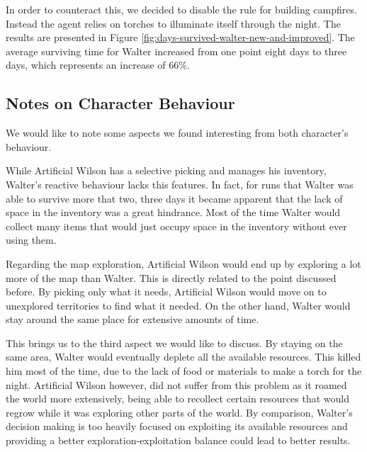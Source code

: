 In order to counteract this, we decided to disable the rule for building campfires.
Instead the agent relies on torches to illuminate itself through the night.
The results are presented in Figure \ref{fig:days-survived-walter-new-and-improved}.
The average surviving time for Walter increased from one point eight days to three days, which represents an increase of 66\%. 


\subsection{Notes on Character Behaviour}

\noindent We would like to note some aspects we found interesting from both character's behaviour.

While Artificial Wilson has a selective picking and manages his inventory, Walter's reactive behaviour lacks this features.
In fact, for runs that Walter was able to survive more that two, three days it became apparent that the lack of space in the inventory was a great hindrance.
Most of the time Walter would collect many items that would just occupy space in the inventory without ever using them.

Regarding the map exploration, Artificial Wilson would end up by exploring a lot more of the map than Walter.
This is directly related to the point discussed before.
By picking only what it needs, Artificial Wilson would move on to unexplored territories to find what it needed.
On the other hand, Walter would stay around the same place for extensive amounts of time.

This brings us to the third aspect we would like to discuss.
By staying on the same area, Walter would eventually deplete all the available resources.
This killed him most of the time, due to the lack of food or materials to make a torch for the night.
Artificial Wilson however, did not suffer from this problem as it roamed the world more extensively, being able to recollect certain resources that would regrow while it was exploring other parts of the world.
By comparison, Walter's decision making is too heavily focused on exploiting its available resources and providing a better exploration-exploitation balance could lead to better results.
